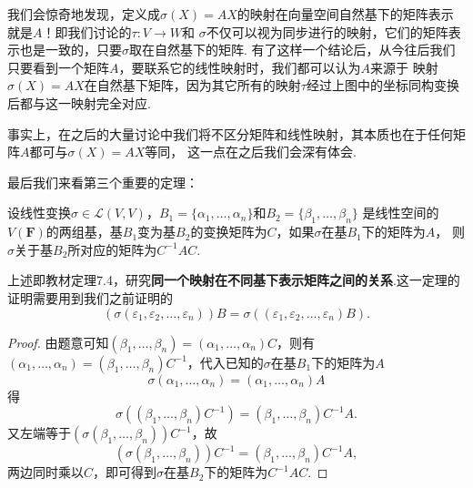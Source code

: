 我们会惊奇地发现，定义成$\sigma(X)=AX$的映射在向量空间自然基下的矩阵表示就是$A$！即我们讨论的$\tau:V\to W$和
$\sigma$不仅可以视为同步进行的映射，它们的矩阵表示也是一致的，只要$\sigma$取在自然基下的矩阵.
有了这样一个结论后，从今往后我们只要看到一个矩阵$A$，要联系它的线性映射时，我们都可以认为$A$来源于
映射$\sigma(X)=AX$在自然基下矩阵，因为其它所有的映射$\tau$经过上图中的坐标同构变换后都与这一映射完全对应.

事实上，在之后的大量讨论中我们将不区分矩阵和线性映射，其本质也在于任何矩阵$A$都可与$\sigma(X)=AX$等同，
这一点在之后我们会深有体会.

最后我们来看第三个重要的定理：
\begin{theorem}[基的选择对映射矩阵的影响] \label{thm:11:基的选择对映射矩阵的影响}
    设线性变换$\sigma \in \mathcal{L}(V,V)$，$B_1=\{\alpha_1,\ldots,\alpha_n\}$和$B_2=\{\beta_1,\ldots,\beta_n\}$
    是线性空间的$V(\mathbf{F})$的两组基，基$B_1$变为基$B_2$的变换矩阵为$C$，如果$\sigma$在基$B_1$下的矩阵为$A$，
    则$\sigma$关于基$B_2$所对应的矩阵为$C^{-1}AC$.
\end{theorem}
上述即教材定理7.4，研究\textbf{同一个映射在不同基下表示矩阵之间的关系}.这一定理的证明需要用到我们之前证明的
\[(\sigma(\varepsilon_1,\varepsilon_2,\ldots,\varepsilon_n))B=\sigma((\varepsilon_1,\varepsilon_2,\ldots,\varepsilon_n)B).\]

\begin{proof}
    由题意可知$(\beta_1,\ldots,\beta_n)=(\alpha_1,\ldots,\alpha_n)C$，则有
    $(\alpha_1,\ldots,\alpha_n)=(\beta_1,\ldots,\beta_n)C^{-1}$，代入已知的$\sigma$在基$B_1$下的矩阵为$A$
    \[\sigma(\alpha_1,\ldots,\alpha_n)=(\alpha_1,\ldots,\alpha_n)A\]
    得
    \[\sigma((\beta_1,\ldots,\beta_n)C^{-1})=(\beta_1,\ldots,\beta_n)C^{-1}A.\]
    又左端等于$(\sigma(\beta_1,\ldots,\beta_n))C^{-1}$，故
    \[(\sigma(\beta_1,\ldots,\beta_n))C^{-1}=(\beta_1,\ldots,\beta_n)C^{-1}A,\]
    两边同时乘以$C$，即可得到$\sigma$在基$B_2$下的矩阵为$C^{-1}AC$.
\end{proof}

